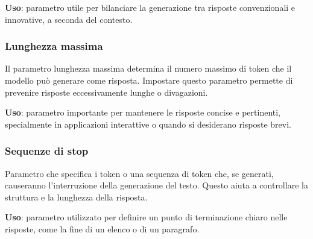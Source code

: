            \textbf{Uso}: parametro utile per bilanciare la generazione tra risposte convenzionali e innovative, a seconda del contesto. 
        
        \subsubsection{Lunghezza massima}
            Il parametro lunghezza massima determina il numero massimo di token che il modello può generare come risposta.	Impostare questo parametro permette di prevenire risposte eccessivamente lunghe o divagazioni. 

            \textbf{Uso}: parametro importante per mantenere le risposte concise e pertinenti, specialmente in applicazioni interattive o quando si desiderano risposte brevi. 
            
        \subsubsection{Sequenze di stop}
            Parametro che specifica i token o una sequenza di token che, se generati, causeranno l'interruzione della generazione del testo. Questo aiuta a controllare la struttura e la lunghezza della risposta. 

            \textbf{Uso}: parametro utilizzato per definire un punto di terminazione chiaro nelle risposte, come la fine di un elenco o di un paragrafo. 
            
